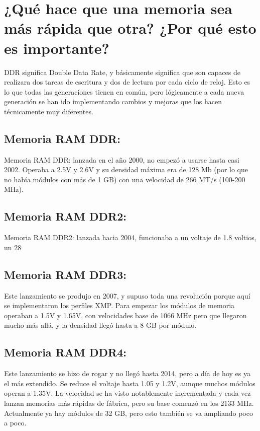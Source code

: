 \documentclass{article}
\begin{document}
\section{¿Qué hace que una memoria sea más rápida que otra? ¿Por qué esto es importante?}
DDR significa Double Data Rate, y básicamente significa que son capaces de realizara dos tareas de escritura y dos de lectura por cada ciclo de reloj. Esto es lo que todas las generaciones tienen en común, pero lógicamente a cada nueva generación se han ido implementando cambios y mejoras que los hacen técnicamente muy diferentes.

\subsection{Memoria RAM DDR:}
Memoria RAM DDR: lanzada en el año 2000, no empezó a usarse hasta casi 2002. Operaba a 2.5V y 2.6V y su densidad máxima era de 128 Mb (por lo que no había módulos con más de 1 GB) con una velocidad de 266 MT/s (100-200 MHz).

\subsection{Memoria RAM DDR2:}
Memoria RAM DDR2: lanzada hacia 2004, funcionaba a un voltaje de 1.8 voltios, un 28%

\subsection{Memoria RAM DDR3:}
Este lanzamiento se produjo en 2007, y supuso toda una revolución porque aquí se implementaron los perfiles XMP. Para empezar los módulos de memoria operaban a 1.5V y 1.65V, con velocidades base de 1066 MHz pero que llegaron mucho más allá, y la densidad llegó hasta a 8 GB por módulo.

\subsection{Memoria RAM DDR4:}
Este lanzamiento se hizo de rogar y no llegó hasta 2014, pero a día de hoy es ya el más extendido. Se reduce el voltaje hasta 1.05 y 1.2V, aunque muchos módulos operan a 1.35V. La velocidad se ha visto notablemente incrementada y cada vez lanzan memorias más rápidas de fábrica, pero su base comenzó en los 2133 MHz. Actualmente ya hay módulos de 32 GB, pero esto también se va ampliando poco a poco.
\end{document}
